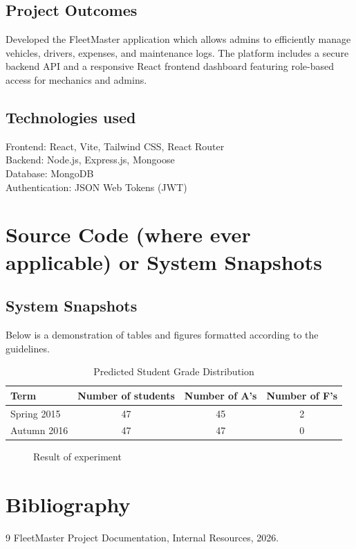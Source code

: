 \documentclass[12pt, a4paper]{report}
\begin{document}
\section{Project Outcomes}
Developed the FleetMaster application which allows admins to efficiently manage vehicles, drivers, expenses, and maintenance logs. The platform includes a secure backend API and a responsive React frontend dashboard featuring role-based access for mechanics and admins.

\section{Technologies used}
Frontend: React, Vite, Tailwind CSS, React Router\\
Backend: Node.js, Express.js, Mongoose\\
Database: MongoDB\\
Authentication: JSON Web Tokens (JWT)

\chapter{Source Code (where ever applicable) or System Snapshots}

\section{System Snapshots}
Below is a demonstration of tables and figures formatted according to the guidelines.

\begin{table}[h!]
\centering
\caption{Predicted Student Grade Distribution}
\vspace{0.2cm}
\begin{tabular}{|l|c|c|c|}
\hline
Term & Number of students & Number of A's & Number of F's \\
\hline
Spring 2015 & 47 & 45 & 2 \\
Autumn 2016 & 47 & 47 & 0 \\
\hline
\end{tabular}
\end{table}

\begin{figure}[h!]
\centering
\vspace{2cm} %
\caption{Result of experiment}
\end{figure}

\setcounter{chapter}{11}
\chapter{Bibliography}
\begin{thebibliography}{9}
FleetMaster Project Documentation, Internal Resources, 2026.
\end{thebibliography}
\end{document}
